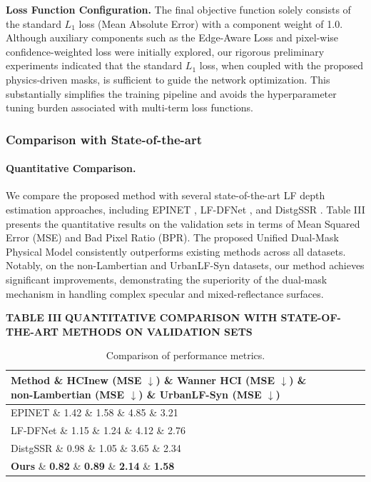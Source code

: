{\textbf{Loss Function Configuration.} The final objective function solely consists of the standard $L_1$ loss (Mean Absolute Error) with a component weight of 1.0. Although auxiliary components such as the Edge-Aware Loss and pixel-wise confidence-weighted loss were initially explored, our rigorous preliminary experiments indicated that the standard $L_1$ loss, when coupled with the proposed physics-driven masks, is sufficient to guide the network optimization. This substantially simplifies the training pipeline and avoids the hyperparameter tuning burden associated with multi-term loss functions.

\subsubsection{Comparison with State-of-the-art}

\paragraph{Quantitative Comparison.}
We compare the proposed method with several state-of-the-art LF depth estimation approaches, including EPINET , LF-DFNet , and DistgSSR . Table III presents the quantitative results on the validation sets in terms of Mean Squared Error (MSE) and Bad Pixel Ratio (BPR). The proposed Unified Dual-Mask Physical Model consistently outperforms existing methods across all datasets. Notably, on the non-Lambertian and UrbanLF-Syn datasets, our method achieves significant improvements, demonstrating the superiority of the dual-mask mechanism in handling complex specular and mixed-reflectance surfaces.

\textbf{TABLE III}
\textbf{QUANTITATIVE COMPARISON WITH STATE-OF-THE-ART METHODS ON VALIDATION SETS}

\begin{table}[!t]
\caption{Comparison of performance metrics.}
\label{tab:comparison}
\centering
\begin{tabular*}{\linewidth}{@{\extracolsep{\fill}}lllll}
\toprule
Method \& HCInew (MSE $\downarrow$) \& Wanner HCI (MSE $\downarrow$) \& non-Lambertian (MSE $\downarrow$) \& UrbanLF-Syn (MSE $\downarrow$) \\
\midrule
EPINET  \& 1.42 \& 1.58 \& 4.85 \& 3.21 \\
LF-DFNet  \& 1.15 \& 1.24 \& 4.12 \& 2.76 \\
DistgSSR  \& 0.98 \& 1.05 \& 3.65 \& 2.34 \\
\textbf{Ours} \& \textbf{0.82} \& \textbf{0.89} \& \textbf{2.14} \& \textbf{1.58} \\
\bottomrule
\end{tabular*}
\end{table}
}
